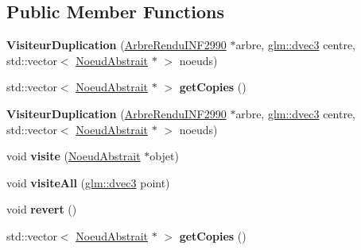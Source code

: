 \subsection*{Public Member Functions}
\begin{DoxyCompactItemize}
\item 
\hypertarget{class_visiteur_duplication_a8414468ed98104dc0021bac950ae024e}{{\bfseries Visiteur\-Duplication} (\hyperlink{class_arbre_rendu_i_n_f2990}{Arbre\-Rendu\-I\-N\-F2990} $\ast$arbre, \hyperlink{group__core__types_ga7f3287f952e6ccb481231368091702ac}{glm\-::dvec3} centre, std\-::vector$<$ \hyperlink{class_noeud_abstrait}{Noeud\-Abstrait} $\ast$ $>$ noeuds)}\label{class_visiteur_duplication_a8414468ed98104dc0021bac950ae024e}

\item 
\hypertarget{class_visiteur_duplication_a90724e00899dbefc0709dc74bda25f9e}{std\-::vector$<$ \hyperlink{class_noeud_abstrait}{Noeud\-Abstrait} $\ast$ $>$ {\bfseries get\-Copies} ()}\label{class_visiteur_duplication_a90724e00899dbefc0709dc74bda25f9e}

\item 
\hypertarget{group__inf2990_ga8414468ed98104dc0021bac950ae024e}{{\bfseries Visiteur\-Duplication} (\hyperlink{class_arbre_rendu_i_n_f2990}{Arbre\-Rendu\-I\-N\-F2990} $\ast$arbre, \hyperlink{group__core__types_ga7f3287f952e6ccb481231368091702ac}{glm\-::dvec3} centre, std\-::vector$<$ \hyperlink{class_noeud_abstrait}{Noeud\-Abstrait} $\ast$ $>$ noeuds)}\label{group__inf2990_ga8414468ed98104dc0021bac950ae024e}

\item 
\hypertarget{group__inf2990_ga5fb08c9779e47f2242f17c3901a9e5f0}{void {\bfseries visite} (\hyperlink{class_noeud_abstrait}{Noeud\-Abstrait} $\ast$objet)}\label{group__inf2990_ga5fb08c9779e47f2242f17c3901a9e5f0}

\item 
\hypertarget{group__inf2990_ga9a9e38fcb3587b612537f52c92911fa6}{void {\bfseries visite\-All} (\hyperlink{group__core__types_ga7f3287f952e6ccb481231368091702ac}{glm\-::dvec3} point)}\label{group__inf2990_ga9a9e38fcb3587b612537f52c92911fa6}

\item 
\hypertarget{group__inf2990_ga3482b5c805172df88b04f233947997ed}{void {\bfseries revert} ()}\label{group__inf2990_ga3482b5c805172df88b04f233947997ed}

\item 
\hypertarget{group__inf2990_ga90724e00899dbefc0709dc74bda25f9e}{std\-::vector$<$ \hyperlink{class_noeud_abstrait}{Noeud\-Abstrait} $\ast$ $>$ {\bfseries get\-Copies} ()}\label{group__inf2990_ga90724e00899dbefc0709dc74bda25f9e}

\end{DoxyCompactItemize}
